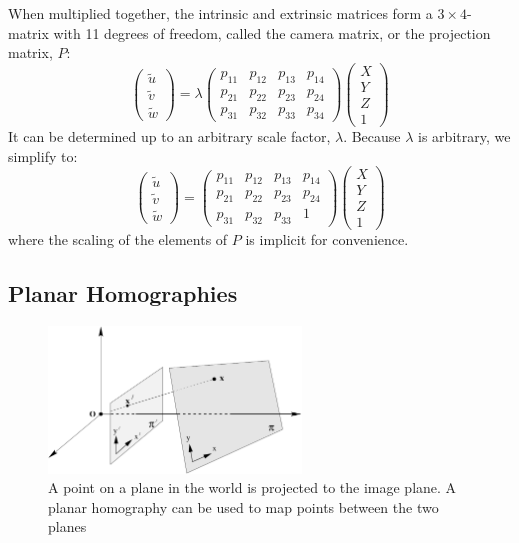 When multiplied together, the intrinsic and extrinsic matrices form a $3\times4$-matrix with 11 degrees of freedom, called the camera matrix, or the projection matrix, $P$:
$$\begin{pmatrix} \tilde{u} \\ \tilde{v} \\ \tilde{w} \end{pmatrix} = \lambda
\begin{pmatrix} p_{11} & p_{12} & p_{13} & p_{14} \\
 				p_{21} & p_{22} & p_{23} & p_{24} \\
				p_{31} & p_{32} & p_{33} & p_{34} \end{pmatrix}
\begin{pmatrix}X \\Y \\Z \\1\end{pmatrix}$$
It can be determined up to an arbitrary scale factor, $\lambda$.
Because $\lambda$ is arbitrary, we simplify to:
$$\begin{pmatrix} \tilde{u} \\ \tilde{v} \\ \tilde{w} \end{pmatrix} =
\begin{pmatrix} p_{11} & p_{12} & p_{13} & p_{14} \\
 				p_{21} & p_{22} & p_{23} & p_{24} \\
				p_{31} & p_{32} & p_{33} & 1 \end{pmatrix}
\begin{pmatrix}X \\Y \\Z \\1\end{pmatrix}$$
where the scaling of the elements of $P$ is implicit for convenience. \cite[153-165]{hartley-zisserman}
\subsection{Planar Homographies}

\begin{figure}[h]
\begin{center}
\includegraphics[width=0.6\textwidth]{figures/planar_homography.pdf}
\end{center}
\caption{A point on a plane in the world is projected to the image plane. A planar homography can be used to map points between the two planes} %
\label{fig:planar_homography}
\end{figure}

